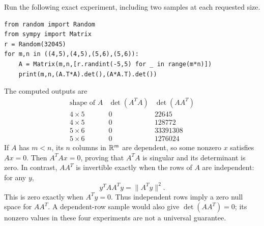 Run the following exact experiment, including two samples at each requested size.
\begin{verbatim}
from random import Random
from sympy import Matrix
r = Random(32045)
for m,n in ((4,5),(4,5),(5,6),(5,6)):
    A = Matrix(m,n,[r.randint(-5,5) for _ in range(m*n)])
    print(m,n,(A.T*A).det(),(A*A.T).det())
\end{verbatim}
The computed outputs are
\[\begin{array}{c|rr}\text{shape of }A&\det(A^TA)&\det(AA^T)\\\hline
4\times5&0&22645\\4\times5&0&128772\\5\times6&0&33391308\\5\times6&0&1276024\end{array}\]
If $A$ has $m<n$, its $n$ columns in $\mathbb{R}^m$ are dependent, so some nonzero $x$ satisfies $Ax=0$. Then $A^TAx=0$, proving that $A^TA$ is singular and its determinant is zero. In contrast, $AA^T$ is invertible exactly when the rows of $A$ are independent: for any $y$,
\[
y^TAA^Ty=\|A^Ty\|^2.
\]
This is zero exactly when $A^Ty=0$. Thus independent rows imply a zero null space for $AA^T$. A dependent-row sample would also give $\det(AA^T)=0$; its nonzero values in these four experiments are not a universal guarantee.

